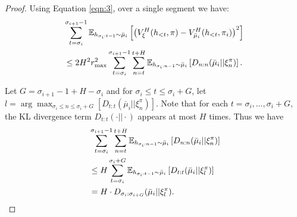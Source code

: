 \begin{proof}
    Using Equation \ref{eqn:3}, over a single segment we have:
    \begin{multline}
        \sum_{t=\sigma_i}^{\sigma_{i+1}-1} \mathbb{E}_{h_{\sigma_i:t-1} \sim \bar{\mu}_i} \left[ \left( V_{\xi}^{H}(h_{<t}, \pi) - V_{\bar{\mu}_i}^{H}(h_{<t}, \pi_i) \right)^2 \right] \\
        \leq 
        2 H^2 r_{\max}^2 \sum_{t=\sigma_i}^{\sigma_{i+1}-1} \sum_{n=t}^{t+H} \mathbb{E}_{h_{\sigma_i:n-1} \sim \bar{\mu}_i} \left[ D_{n:n}(\bar{\mu}_i || \xi_n^{\pi}) \right]. \label{eqn:4}
    \end{multline}

    Let $G = \sigma_{i+1}-1 + H - \sigma_i$ and for $\sigma_i \leq t \leq \sigma_i + G$, let $l = \arg\max_{\sigma_i \leq n \leq \sigma_i + G} \left[ D_{t:t}(\bar{\mu}_i || \xi_{n}^{\pi}) \right]$. 
    Note that for each $t = \sigma_i, \ldots, \sigma_i+G$, the KL divergence term $D_{t:t}(\cdot || \cdot)$ appears at most $H$ times. Thus we have
    \begin{equation}
    \begin{split}
        &\sum_{t = \sigma_i}^{\sigma_{i+1}-1} \sum_{n = t}^{t+H} \mathbb{E}_{h_{\sigma_i:n-1} \sim \bar{\mu}_i} \left[ D_{n:n}(\bar{\mu}_i || \xi_n^{\pi}) \right] \\
        &\leq H \sum_{t=\sigma_i}^{\sigma_{i}+G} \mathbb{E}_{h_{\sigma_i:t-1} \sim \bar{\mu}_i} \left[ D_{t:t}(\bar{\mu}_i || \xi_{l}^{\pi}) \right]\\
        &= H \cdot D_{\sigma_i: \sigma_{i+G}} (\bar{\mu}_i || \xi^{\pi}_{l}).
    \end{split}
    \end{equation}


\end{proof}
